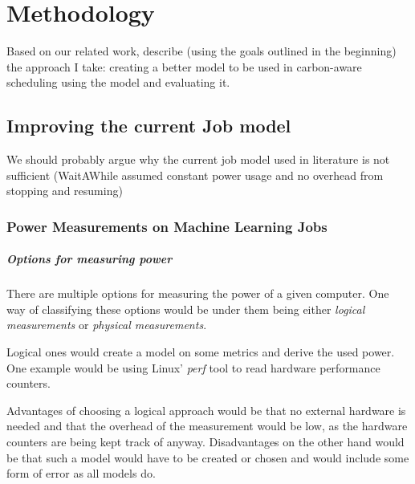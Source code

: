 \chapter{Methodology}

Based on our related work, describe (using the goals outlined in the beginning) the approach I take:
creating a better model to be used in carbon-aware scheduling 
using the model and evaluating it.
\section{Improving the current Job model} \label{sec:improving_the_model}

We should probably argue why the current job model used in literature is not sufficient (WaitAWhile\cite{wiesner_lets_2021} assumed constant power usage and no overhead from stopping and resuming)

\subsection{Power Measurements on Machine Learning Jobs}
\label{sec:power_measurements}



\paragraph{Options for measuring power}

There are multiple options for measuring the power of a given computer. One way of classifying these options would be under them being either \emph{logical measurements} or \emph{physical measurements}.

Logical ones would create a model on some metrics and derive the used power. One example would be using Linux' \emph{perf} tool to read hardware performance counters. 

Advantages of choosing a logical approach would be that no external hardware is needed and that the overhead of the measurement would be low, as the hardware counters are being kept track of anyway. Disadvantages on the other hand would be that such a model would have to be created or chosen and would include some form of error as all models do.


